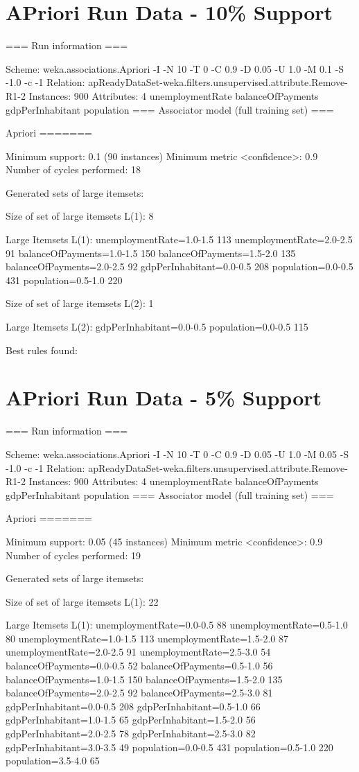 \section{APriori Run Data - 10\% Support}
=== Run information ===

Scheme:       weka.associations.Apriori -I -N 10 -T 0 -C 0.9 -D 0.05 -U 1.0 -M 0.1 -S -1.0 -c -1
Relation:     apReadyDataSet-weka.filters.unsupervised.attribute.Remove-R1-2
Instances:    900
Attributes:   4
              unemploymentRate
              balanceOfPayments
              gdpPerInhabitant
              population
=== Associator model (full training set) ===


Apriori
=======

Minimum support: 0.1 (90 instances)
Minimum metric <confidence>: 0.9
Number of cycles performed: 18

Generated sets of large itemsets:

Size of set of large itemsets L(1): 8

Large Itemsets L(1):
unemploymentRate=1.0-1.5 113
unemploymentRate=2.0-2.5 91
balanceOfPayments=1.0-1.5 150
balanceOfPayments=1.5-2.0 135
balanceOfPayments=2.0-2.5 92
gdpPerInhabitant=0.0-0.5 208
population=0.0-0.5 431
population=0.5-1.0 220

Size of set of large itemsets L(2): 1

Large Itemsets L(2):
gdpPerInhabitant=0.0-0.5 population=0.0-0.5 115

Best rules found:

\section{APriori Run Data - 5\% Support}
=== Run information ===

Scheme:       weka.associations.Apriori -I -N 10 -T 0 -C 0.9 -D 0.05 -U 1.0 -M 0.05 -S -1.0 -c -1
Relation:     apReadyDataSet-weka.filters.unsupervised.attribute.Remove-R1-2
Instances:    900
Attributes:   4
              unemploymentRate
              balanceOfPayments
              gdpPerInhabitant
              population
=== Associator model (full training set) ===


Apriori
=======

Minimum support: 0.05 (45 instances)
Minimum metric <confidence>: 0.9
Number of cycles performed: 19

Generated sets of large itemsets:

Size of set of large itemsets L(1): 22

Large Itemsets L(1):
unemploymentRate=0.0-0.5 88
unemploymentRate=0.5-1.0 80
unemploymentRate=1.0-1.5 113
unemploymentRate=1.5-2.0 87
unemploymentRate=2.0-2.5 91
unemploymentRate=2.5-3.0 54
balanceOfPayments=0.0-0.5 52
balanceOfPayments=0.5-1.0 56
balanceOfPayments=1.0-1.5 150
balanceOfPayments=1.5-2.0 135
balanceOfPayments=2.0-2.5 92
balanceOfPayments=2.5-3.0 81
gdpPerInhabitant=0.0-0.5 208
gdpPerInhabitant=0.5-1.0 66
gdpPerInhabitant=1.0-1.5 65
gdpPerInhabitant=1.5-2.0 56
gdpPerInhabitant=2.0-2.5 78
gdpPerInhabitant=2.5-3.0 82
gdpPerInhabitant=3.0-3.5 49
population=0.0-0.5 431
population=0.5-1.0 220
population=3.5-4.0 65

